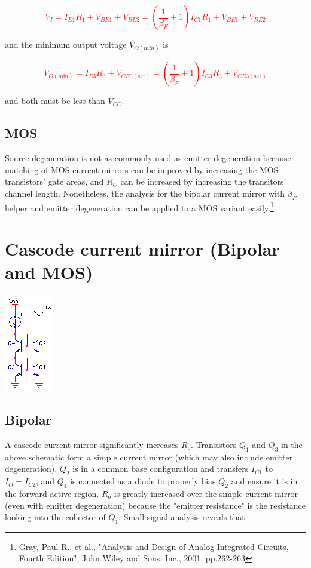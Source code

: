 \textcolor{red}{
\begin{equation}
V_{I} = I_{E1}R_{1}+V_{BE1}+V_{BE2} = \left(\frac{1}{\beta_{F}}+1\right)I_{C1}R_{1}+V_{BE1}+V_{BE2}
\end{equation}
}

and the minimum output voltage $V_{O(min)}$ is

\textcolor{red}{
\begin{equation}
V_{O(\text{min})} = I_{E3}R_{3}+V_{CE3(\text{sat})} = \left(\frac{1}{\beta_{F}}+1\right)I_{C3}R_{3}+V_{CE3(\text{sat})}
\end{equation}
}

and both must be less than $V_{CC}$.
\subsection{MOS}
Source degeneration is not as commonly used as emitter degeneration because matching of MOS current mirrors can be improved by increasing the MOS transistors' gate areas, and $R_{O}$ can be increased by increasing the transitors' channel length. Nonetheless, the analysis for the bipolar current mirror with $\beta_{F}$ helper and emitter degeneration can be applied to a MOS variant easily.\footnote{Gray, Paul R., et al., "Analysis and Design of Analog Integrated Circuits, Fourth Edition", John Wiley and Sons, Inc., 2001, pp.262-263}

\section{Cascode current mirror (Bipolar and MOS)}
\begin{center}
	\includegraphics{schematics/cascodecurrentmirror.PNG}
\end{center}

\subsection{Bipolar}
A cascode current mirror significantly increases $R_{o}$. Transistors $Q_{1}$ and $Q_{3}$ in the above schematic form a simple current mirror (which may also include emitter degeneration). $Q_{2}$ is in a common base configuration and transfers $I_{C1}$ to $I_{O} = I_{C2}$, and $Q_{4}$ is connected as a diode to properly bias $Q_{2}$ and ensure it is in the forward active region. $R_{o}$ is greatly increased over the simple current mirror (even with emitter degeneration) because the "emitter resistance" is the resistance looking into the collector of $Q_{1}$. Small-signal analysis reveals that

